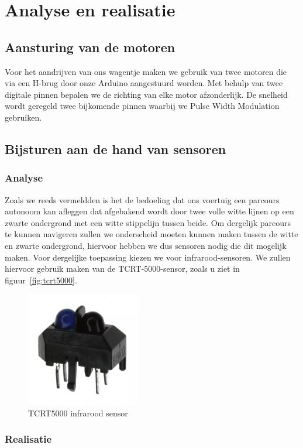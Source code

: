 \documentclass[11pt,a4paper]{report}
\begin{document}
\chapter{Analyse en realisatie}
\section{Aansturing van de motoren}
Voor het aandrijven van ons wagentje maken we gebruik van twee motoren die via een H-brug door onze Arduino aangestuurd worden. Met behulp van twee digitale pinnen bepalen we de richting van elke motor afzonderlijk. De snelheid wordt geregeld twee bijkomende pinnen waarbij we Pulse Width Modulation gebruiken.
\section{Bijsturen aan de hand van sensoren}
\subsection{Analyse}
Zoals we reeds vermeldden is het de bedoeling dat ons voertuig een parcours autonoom kan afleggen dat afgebakend wordt door twee volle witte lijnen op een zwarte ondergrond met een witte stippelijn tussen beide. Om dergelijk parcours te kunnen navigeren zullen we onderscheid moeten kunnen maken tussen de witte en zwarte ondergrond, hiervoor hebben we dus sensoren nodig die dit mogelijk maken. Voor dergelijke toepassing kiezen we voor infrarood-sensoren. We zullen hiervoor gebruik maken van de TCRT-5000-sensor, zoals u ziet in figuur~\vref{fig:tcrt5000}. 

\begin{figure}[H]
	\centering
	\includegraphics[height=5cm]{tcrt5000.png}
	\caption{TCRT5000 infrarood sensor\label{fig:tcrt5000}}
\end{figure}

\subsection{Realisatie}
\end{document}
